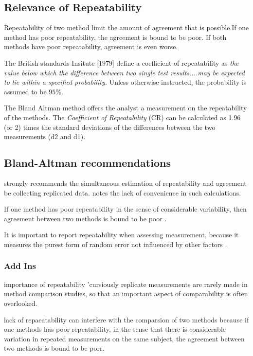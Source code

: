\documentclass[12pt, a4paper]{article}
\begin{document}
\subsection{Relevance of Repeatability} Repeatability of two method limit the amount of agreement that is possible.If one method has poor repeatability, the agreement is bound to be poor. If both methods have poor repeatability, agreement is even worse.

The British standards Insitute [$1979$] define a coefficient of
repeatability  as \emph{the value below which the difference
	between two single test results....may be expected to lie within a
	specified probability.} Unless otherwise instructed, the
probability is assumed to be $95\%$.

The Bland Altman method offers the analyst a measurement on the repeatability of the methods. The \emph{Coefficient of Repeatability} (CR) can be calculated as 1.96 (or 2) times the standard deviations of the differences between the two measurements (d2 and d1).

\subsection{Bland-Altman recommendations}
	
	\citet{BA99} strongly recommends the simultaneous estimation of repeatability and agreement be collecting replicated data. \citet{ARoy2009} notes the lack of convenience in such calculations.
	
	
	If one method has poor repeatability in the sense of considerable variability, then agreement between two methods is bound to be poor \citep{ARoy2009}.
	
	It is important to report repeatability when assessing measurement, because it measures the purest form of random error not influenced by other factors \citep{Barnhart}.


\subsubsection{Add Ins}
importance of repeatability
'cursiously replicate measurements are rarely made in method comparison studies, so that an important aspect of comparability is 
often overlooked.

lack of repaeatability can interfere with the comparsion of two methods because if one methods has poor repeatability, in the sense that there is
considerable variation in repeated measurements on the same subject, the agreement between two methods is bound to be porr.
\end{document}
